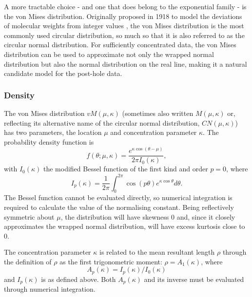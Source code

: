 \documentclass[../../ArchStats.tex]{subfiles}
\begin{document}
A more tractable choice - and one that does belong to the exponential family - is the von Mises distribution. Originally proposed in 1918 to model the deviations of molecular weights from integer values \cite{VonMises1918}, the von Mises distribution is the most commonly used circular distribution, so much so that it is also referred to as the circular normal distribution. For sufficiently concentrated data, the von Mises distribution can be used to approximate not only the wrapped normal distribution but also the normal distribution on the real line, making it a natural candidate model for the post-hole data.

\subsubsection{Density}
The von Mises distribution $vM(\mu, \kappa)$ (sometimes also written $M(\mu, \kappa)$ or, reflecting its alternative name of the circular normal distribution, $CN(\mu, \kappa)$) has two parameters, the location $\mu$ and concentration parameter $\kappa$. The probability density function is
	\begin{equation}
	\label{eq:vM-density}
	f(\theta; \mu, \kappa) = \frac{e^{\kappa \cos(\theta - \mu)}}{2\pi I_0(\kappa)},	
	\end{equation}
with $I_0(\kappa)$ the modified Bessel function of the first kind and order $p=0$, where
	\begin{equation}
	\label{eq:mod-Bessel}
	I_p(\kappa) = \frac{1}{2\pi}\int_0^{2\pi} \cos(p\theta)e^{\kappa \cos \theta} d\theta.
	\end{equation}
The Bessel function cannot be evaluated directly, so numerical integration is required to calculate the value of the normalising constant. Being reflectively symmetric about $\mu$, the distribution will have skewness 0 and, since it closely approximates the wrapped normal distribution, will have excess kurtosis close to 0. 

The concentration parameter $\kappa$ is related to the mean resultant length $\rho$ through the definition of $\rho$ as the first trigonometric moment: $\rho = A_1(\kappa)$, where
	\begin{equation}
	\label{eq:A1}
	A_p(\kappa) = I_p(\kappa)/I_0(\kappa)
	\end{equation}
and $I_p(\kappa)$ is as defined above. Both $A_p(\kappa)$ and its inverse must be evaluated through numerical integration.
\end{document}
